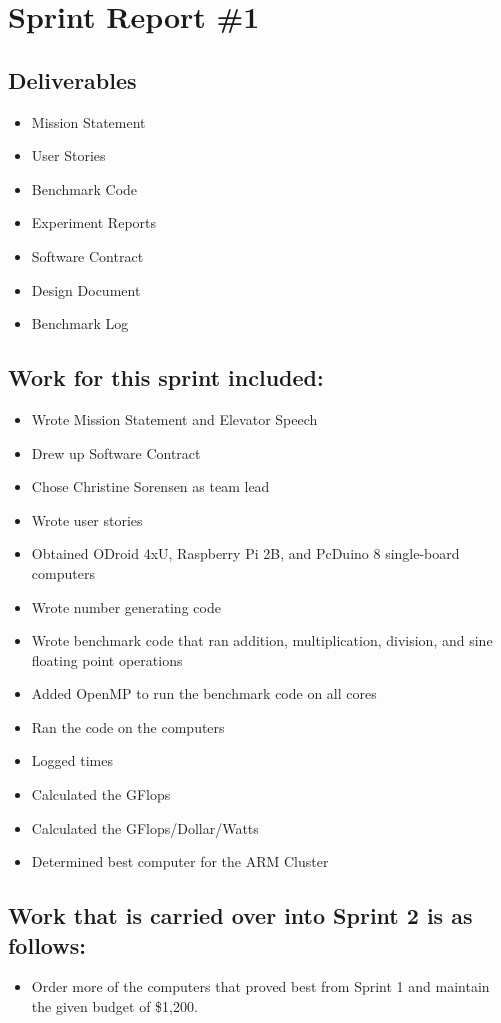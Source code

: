 

\section{Sprint Report \#1}
\subsection{Deliverables}
\begin{itemize}
	\item Mission Statement
	\item User Stories
	\item Benchmark Code
	\item Experiment Reports
	\item Software Contract
	\item Design Document
	\item Benchmark Log
\end{itemize}

\subsection{Work for this sprint included:}
\begin{itemize}
	\item Wrote Mission Statement and Elevator Speech
	\item Drew up Software Contract
	\item Chose Christine Sorensen as team lead
	\item Wrote user stories
	\item Obtained ODroid 4xU, Raspberry Pi 2B, and PcDuino 8 single-board computers
	\item Wrote number generating code
	\item Wrote benchmark code that ran addition, multiplication, division, and sine floating point operations
	\item Added OpenMP to run the benchmark code on all cores
	\item Ran the code on the computers
	\item Logged times
	\item Calculated the GFlops
	\item Calculated the GFlops/Dollar/Watts
	\item Determined best computer for the ARM Cluster
\end{itemize}
\subsection{Work that is carried over into Sprint 2 is as follows:}
\begin{itemize}
	\item Order more of the computers that proved best from Sprint 1 and maintain the given budget of \$1,200.
\end{itemize}

